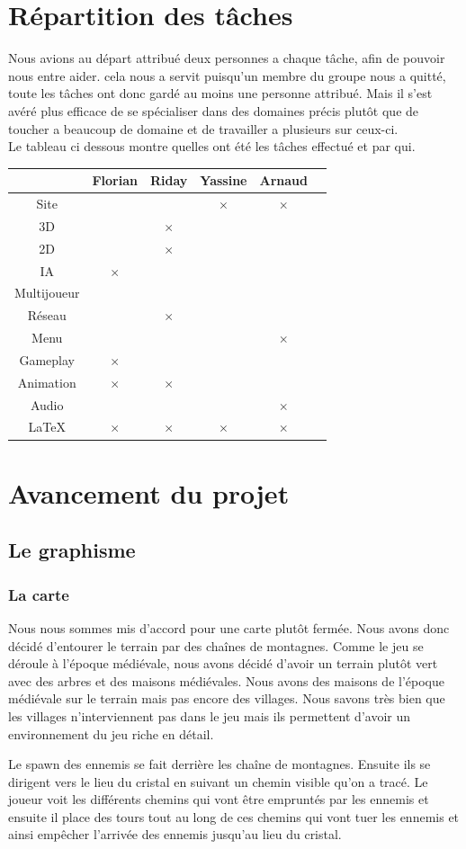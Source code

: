 \documentclass[a4paper, 12pt]{article}
\begin{document}
\section{Répartition des tâches}
Nous avions au départ attribué deux personnes a chaque tâche, afin de pouvoir nous entre aider. cela nous a servit puisqu'un membre du groupe nous a quitté, toute les tâches ont donc gardé au moins une personne attribué. Mais il s'est avéré plus efficace de se spécialiser dans des domaines précis plutôt que de toucher a beaucoup de domaine et de travailler a plusieurs sur ceux-ci.\\
Le tableau ci dessous montre quelles ont été les tâches effectué et par qui.
\bigbreak
\bigbreak
	\begin{tabular}{|c||c|c|c|c|c|}
		\hline
		& Florian & Riday & Yassine & Arnaud \\
		\hline
		Site & & & $\times$ & $\times$\\
		\hline
		3D & & $\times$ & &\\
		\hline
		2D & & $\times$ & & \\
		\hline
		IA & $\times$ & & & \\
		\hline
		Multijoueur &  & &  &\\
		\hline
		Réseau & & $\times$ & & \\
		\hline
		Menu & & & & $\times$\\
		\hline
		Gameplay & $\times$ & & &\\
		\hline
		Animation & $\times$ & $\times$ & & \\		
		\hline
		Audio & & & & $\times$\\
		\hline
		\LaTeX & $\times$ & $\times$ & $\times$ & $\times$\\
		\hline
	\end{tabular}
	\newpage
\newpage
\section{Avancement du projet}
	\subsection{Le graphisme}
		\subsubsection{La carte}
		Nous nous sommes mis d’accord pour une carte plutôt fermée. Nous avons donc décidé d’entourer le terrain par des chaînes de montagnes. Comme le jeu se déroule à l’époque médiévale, nous avons décidé d’avoir un terrain plutôt vert avec des arbres et des maisons médiévales. Nous avons des maisons de l’époque médiévale sur le terrain mais pas encore des villages. Nous savons très bien que les villages n’interviennent pas dans le jeu mais ils permettent d’avoir un environnement du jeu riche en détail. 
\par Le spawn des ennemis se fait derrière les chaîne de montagnes. Ensuite ils se dirigent vers le lieu du cristal en suivant un chemin visible qu’on a tracé. Le joueur voit les différents chemins qui vont être empruntés par les ennemis et ensuite il place des tours tout au long de ces chemins qui vont tuer les ennemis et ainsi empêcher l’arrivée des ennemis jusqu’au lieu du cristal.
\end{document}
